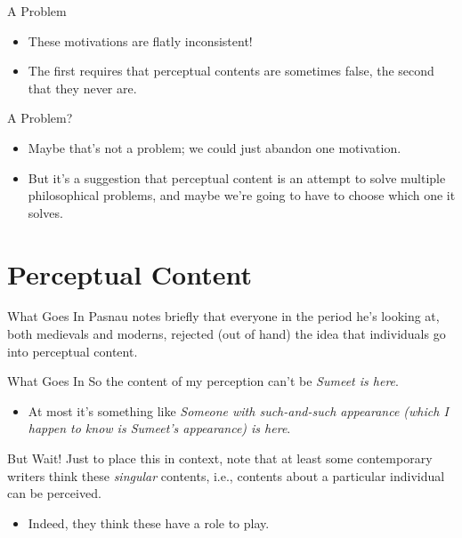 \documentclass[
  17pt,
  letterpaper,
  ignorenonframetext,
  aspectratio=169,
]{beamer}
\providecommand{\tightlist}{%
  \setlength{\itemsep}{0pt}\setlength{\parskip}{0pt}}\usepackage{longtable,booktabs,array}
\begin{document}
\begin{frame}{A Problem}
\protect\hypertarget{a-problem}{}
\begin{itemize}[<+->]
\tightlist
\item
  These motivations are flatly inconsistent!
\item
  The first requires that perceptual contents are sometimes false, the
  second that they never are.
\end{itemize}
\end{frame}

\begin{frame}{A Problem?}
\protect\hypertarget{a-problem-1}{}
\begin{itemize}[<+->]
\tightlist
\item
  Maybe that's not a problem; we could just abandon one motivation.
\item
  But it's a suggestion that perceptual content is an attempt to solve
  multiple philosophical problems, and maybe we're going to have to
  choose which one it solves.
\end{itemize}
\end{frame}

\hypertarget{perceptual-content}{%
\section{Perceptual Content}\label{perceptual-content}}

\begin{frame}{What Goes In}
\protect\hypertarget{what-goes-in}{}
Pasnau notes briefly that everyone in the period he's looking at, both
medievals and moderns, rejected (out of hand) the idea that individuals
go into perceptual content.
\end{frame}

\begin{frame}{What Goes In}
\protect\hypertarget{what-goes-in-1}{}
So the content of my perception can't be \emph{Sumeet is here}.

\begin{itemize}[<+->]
\tightlist
\item
  At most it's something like \emph{Someone with such-and-such
  appearance (which I happen to know is Sumeet's appearance) is here}.
\end{itemize}
\end{frame}

\begin{frame}{But Wait!}
\protect\hypertarget{but-wait}{}
Just to place this in context, note that at least some contemporary
writers think these \emph{singular} contents, i.e., contents about a
particular individual can be perceived.

\begin{itemize}[<+->]
\tightlist
\item
  Indeed, they think these have a role to play.
\end{itemize}
\end{frame}
\end{document}
